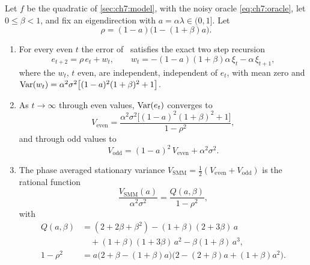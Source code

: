 \begin{theorem}\label{thm:smmvar}
Let $f$ be the quadratic of \cref{sec:ch7:model}, with the noisy oracle
\eqref{eq:ch7:oracle}, let $0\le\beta<1$, and fix an eigendirection with
$a=\alpha\lambda\in(0,1]$. Let
\[
  \rho=(1-a)\bigl(1-(1+\beta)a\bigr).
\]
\begin{enumerate}[label=(\roman*),leftmargin=2em]
\item For every even $t$ the error of \smmdet\ satisfies the exact two step
recursion
\begin{equation}\label{eq:ch7:twostep}
  e_{t+2}=\rho\,e_t+w_t,\qquad
  w_t=-(1-a)(1+\beta)\alpha\,\xi_t-\alpha\,\xi_{t+1},
\end{equation}
where the $w_t$, $t$ even, are independent, independent of $e_t$, with mean zero and
$\operatorname{Var}(w_t)=\alpha^2\sigma^2\bigl[(1-a)^2(1+\beta)^2+1\bigr]$.
\item As $t\to\infty$ through even values, $\operatorname{Var}(e_t)$ converges to
\begin{equation}\label{eq:ch7:veven}
  V_{\mathrm{even}}=\frac{\alpha^2\sigma^2\bigl[(1-a)^2(1+\beta)^2+1\bigr]}{1-\rho^2},
\end{equation}
and through odd values to
\begin{equation}\label{eq:ch7:vodd}
  V_{\mathrm{odd}}=(1-a)^2\,V_{\mathrm{even}}+\alpha^2\sigma^2 .
\end{equation}
\item The phase averaged stationary variance
$V_{\mathrm{SMM}}=\tfrac12(V_{\mathrm{even}}+V_{\mathrm{odd}})$ is the rational
function
\begin{equation}\label{eq:ch7:vavg}
  \frac{V_{\mathrm{SMM}}(a)}{\alpha^2\sigma^2}
  =\frac{Q(a,\beta)}{1-\rho^2},
\end{equation}
with
\begin{align*}
  Q(a,\beta)&=(2+2\beta+\beta^2)-(1+\beta)(2+3\beta)\,a\\
  &\quad+(1+\beta)(1+3\beta)\,a^2-\beta(1+\beta)\,a^3,\\
  1-\rho^2&=a\bigl(2+\beta-(1+\beta)a\bigr)\bigl(2-(2+\beta)a+(1+\beta)a^2\bigr).
\end{align*}
\end{enumerate}
\end{theorem}


